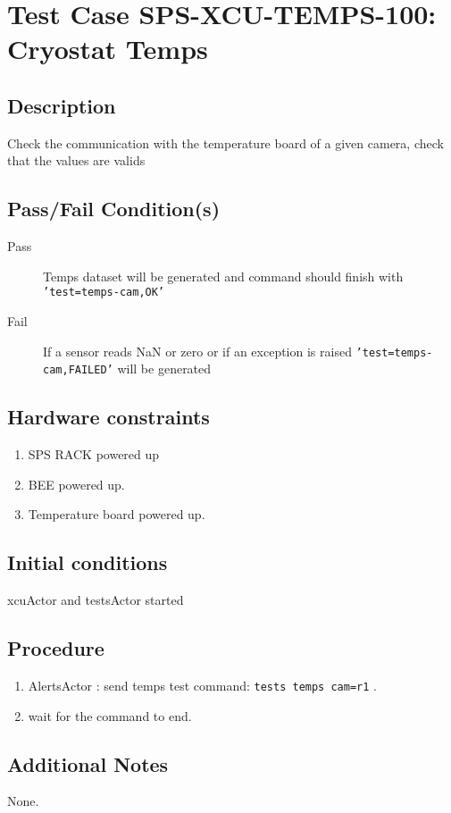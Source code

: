 \section{Test Case SPS-XCU-TEMPS-100: Cryostat Temps}

\subsection{Description}

Check the communication with the temperature board of a given camera, check that the values are valids

\subsection{Pass/Fail Condition(s)}

\begin{description}
\item [Pass] Temps dataset will be generated and command should finish with \texttt{'test=temps-cam,OK'}
\item [Fail] If a sensor reads NaN or zero or if an exception is raised \texttt{'test=temps-cam,FAILED'} will be generated

\end{description}

\subsection{Hardware constraints}

\begin{enumerate}
    \item SPS RACK powered up
    \item BEE powered up.
    \item Temperature board powered up.
\end{enumerate}

\subsection{Initial conditions}

xcuActor and testsActor started

\subsection{Procedure}

\begin{enumerate}
    \item AlertsActor : send temps test command: \texttt{tests temps cam=r1} .
    \item wait for the command to end.
\end{enumerate}

\subsection{Additional Notes}
None.
